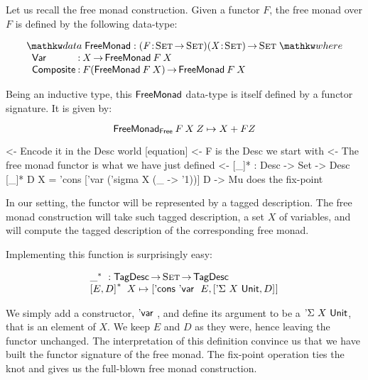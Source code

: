 \newcommand{\FMFreeMonad}{\D{FreeMonad}}
\newcommand{\FMFreeMonadF}{\D{FreeMonad$_{\CN{Free}}$}}
\newcommand{\FMVar}{\C{Var}}
\newcommand{\FMComposite}{\C{Composite}}

Let us recall the free monad construction. Given a functor $F$, the
free monad over $F$ is defined by the following data-type:

\[
\stk{
\data \FMFreeMonad : \PITEL{\V{F}}{\Set \To \Set} 
                     \PI{\V{X}}{\Set} 
                     \Set 
\where \\
\;\;\begin{array}{@{}l@{\::\:}l@{\quad}l}
    \FMVar           & X \To \FMFreeMonad\: F\: X                            \\
    \FMComposite     & F (\FMFreeMonad\: F\: X) \To \FMFreeMonad\: F\: X    
\end{array}
}
\]


Being an inductive type, this $\FMFreeMonad$ data-type is itself
defined by a functor signature. It is given by:

\[
\FMFreeMonadF\: F\: X\: Z \mapsto X + F Z
\]

\begin{wstructure}
    <- Encode it in the Desc world [equation]
        <- F is the Desc we start with
        <- The free monad functor is what we have just defined
        <- [\_]* : Desc -> Set -> Desc
           [\_]* D X = 'cons ['var ('sigma X (\_ -> '1))] D
        -> Mu does the fix-point
\end{wstructure}

In our setting, the functor will be represented by a tagged
description. The free monad construction will take such tagged
description, a set $X$ of variables, and will compute the tagged
description of the corresponding free monad.

Implementing this function is surprisingly easy:

\[\stk{
\FreeMonad{\_} : \TagDesc \To \Set \To \TagDesc \\
\FreeMonad{\pair{E}{D}{}}\:X \mapsto
    \pair{\ListCons{\DVar{}}{E}}
         {\pair{\DSigma{X}{\Unit}}{D}{}}{}
}\]

We simply add a constructor, $\DVar{}$, and define its argument to be
a $\DSigma{X}{\Unit}$, that is an element of $X$. We keep $E$ and $D$
as they were, hence leaving the functor unchanged. The interpretation
of this definition convince us that we have built the functor
signature of the free monad. The fix-point operation ties the knot and
gives us the full-blown free monad construction.

